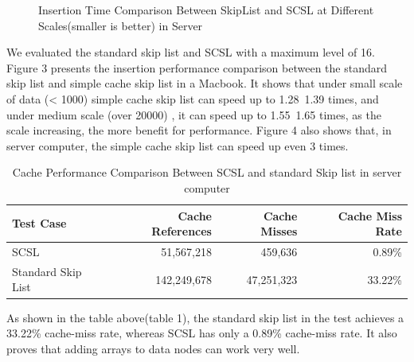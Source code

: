 \documentclass{article}
\begin{document}
\begin{figure}[htbp]
\caption{Insertion Time Comparison Between SkipList and SCSL at Different Scales(smaller is better) in Server}
\end{figure}

We evaluated the standard skip list and SCSL with a maximum level of 16. Figure 3 presents the insertion performance comparison between the standard skip list and simple cache skip list in a Macbook. It shows that under small scale of data (< 1000) simple cache skip list can speed up to 1.28~1.39 times, and under medium scale (over 20000) , it can speed up to 1.55~1.65 times, as the scale increasing, the more benefit for performance. Figure 4 also shows that, in server computer, the simple cache skip list can speed up even 3 times.
\begin{table}
\begin{tabular}{lrrr}
\toprule
Test Case & Cache References & Cache Misses & Cache Miss Rate \\
\midrule
SCSL & 51,567,218 & 459,636 & 0.89\% \\
Standard Skip List & 142,249,678 & 47,251,323 & 33.22\% \\
\bottomrule
\end{tabular}
\caption{Cache Performance Comparison Between SCSL and standard Skip list in server computer}
\end{table}

As shown in the table above(table 1), the standard skip list in the test achieves a 33.22\% cache-miss rate, whereas SCSL has only a 0.89\% cache-miss rate. It also proves that adding arrays to data nodes can work very well.
\end{document}
